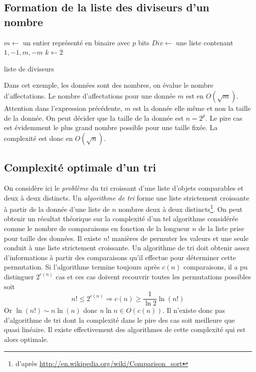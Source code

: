 \subsection{Formation de la liste des diviseurs d'un nombre}
\begin{algorithm}
  $m\leftarrow$ un entier représenté en binaire avec $p$ bits\;
  $Div \leftarrow$ une liste contenant $1,-1,m,-m$\;
  $k \leftarrow 2$\;
  \caption{liste de diviseurs}
  \label{complexite_2}
\end{algorithm}
Dans cet exemple, les données sont des nombres, on évalue le nombre d'affectations. Le nombre d'affectations pour une donnée $m$ est en $O(\sqrt{m})$.\newline
Attention dans l'expression précédente, $m$ est la donnée elle même et non la taille de la donnée. On peut décider que la taille de la donnée est $n=2^p$. Le pire cas est évidemment le plus grand nombre possible pour une taille fixée. La complexité est donc en $O(\sqrt{n})$.

\subsection{Complexité optimale d'un tri}\label{opti}
On considère ici le \emph{problème} du tri croissant d'une liste d'objets comparables et deux à deux distincts.\newline
Un \emph{algorithme de tri} forme une liste strictement croissante à partir de la donnée d'une liste de $n$ nombres deux à deux distincts\footnote{d'après \href{http://en.wikipedia.org/wiki/Comparison_sort}{http://en.wikipedia.org/wiki/Comparison\_sort}}.
On peut obtenir un résultat théorique sur la complexité d'un tel algorithme considérée comme le nombre de comparaisons en fonction de la longueur $n$ de la liste prise pour taille des données.\newline
Il existe $n!$ manières de permuter les valeurs et une seule conduit à une liste strictement croissante. Un algorithme de tri doit obtenir assez d'informations à partir des comparaisons qu'il effectue pour déterminer cette permutation.\newline
Si l'algorithme termine toujours après $c(n)$ comparaisons, il a pu distinguer $2^{c(n)}$ cas et ces cas doivent recouvrir toutes les permutations possibles soit
\begin{displaymath}
  n! \leq 2^{c(n)}\Rightarrow c(n)\geq \frac{1}{\ln 2} \ln(n!)
\end{displaymath}
Or $\ln(n!)\sim n\ln(n)$ donc $n\ln n \in O(c(n))$. Il n'existe donc pas d'algorithme de tri dont la complexité dans le pire des cas soit meilleure que quasi linéaire. Il existe effectivement des algorithmes de cette complexité qui est alors optimale.

